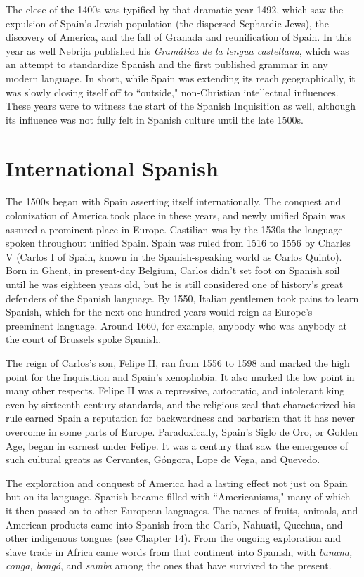 The close of the 1400s was typified by that dramatic year
1492, which saw the expulsion of Spain's Jewish population (the dispersed Sephardic Jews), the discovery of America, and the fall of Granada and reunification of Spain. In this year as well Nebrija published
his \emph{Gramática de la lengua castellana}, which was an attempt to standardize Spanish and the first published grammar in any modern language. In short, while Spain was extending its reach geographically, it
was slowly closing itself off to ``outside," non-Christian intellectual influences. These years were to witness the start of the Spanish Inquisition as well, although its influence was not fully felt in Spanish culture until the late 1500s.

\section{International Spanish}

The 1500s began with Spain asserting itself internationally.
The conquest and colonization of America took place in these years,
and newly unified Spain was assured a prominent place in Europe.
Castilian was by the 1530s the language spoken throughout unified
Spain. Spain was ruled from 1516 to 1556 by Charles V (Carlos I of
Spain, known in the Spanish-speaking world as Carlos Quinto). Born
in Ghent, in present-day Belgium, Carlos didn't set foot on Spanish
soil until he was eighteen years old, but he is still considered one of
history's great defenders of the Spanish language. By 1550, Italian gentlemen took pains to learn Spanish, which for the next one hundred
years would reign as Europe's preeminent language. Around 1660, for
example, anybody who was anybody at the court of Brussels spoke
Spanish.

The reign of Carlos's son, Felipe II, ran from 1556 to 1598 and
marked the high point for the Inquisition and Spain's xenophobia. It
also marked the low point in many other respects. Felipe II was a repressive, autocratic, and intolerant king even by sixteenth-century
standards, and the religious zeal that characterized his rule earned
Spain a reputation for backwardness and barbarism that it has never
overcome in some parts of Europe. Paradoxically, Spain's Siglo de Oro,
or Golden Age, began in earnest under Felipe. It was a century that saw
the emergence of such cultural greats as Cervantes, Góngora, Lope de
Vega, and Quevedo.

The exploration and conquest of America had a lasting effect
not just on Spain but on its language. Spanish became filled with
``Americanisms," many of which it then passed on to other European
languages. The names of fruits, animals, and American products came
into Spanish from the Carib, Nahuatl, Quechua, and other indigenous
tongues (see Chapter 14). From the ongoing exploration and slave trade
in Africa came words from that continent into Spanish, with \emph{banana,
conga, bongó}, and \emph{samba} among the ones that have survived to the
present.


